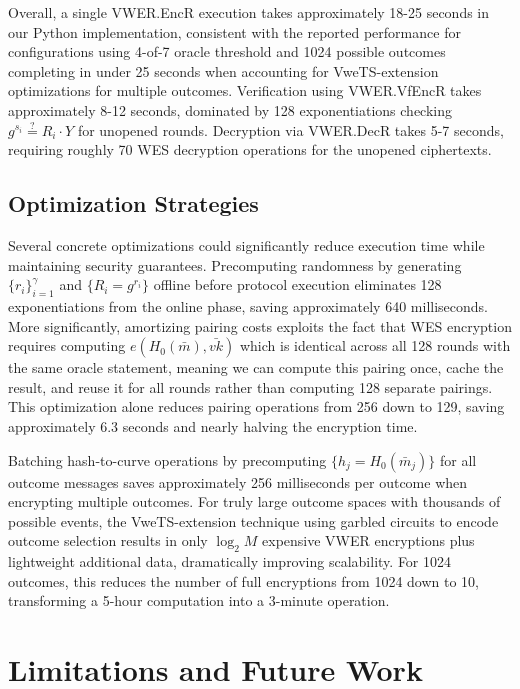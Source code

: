 \documentclass[11pt,a4paper]{article}
\begin{document}
{Overall, a single VWER.EncR execution takes approximately 18-25 seconds in our Python implementation, consistent with the reported performance for configurations using 4-of-7 oracle threshold and 1024 possible outcomes completing in under 25 seconds when accounting for VweTS-extension optimizations for multiple outcomes. Verification using VWER.VfEncR takes approximately 8-12 seconds, dominated by 128 exponentiations checking $g^{s_i} \stackrel{?}{=} R_i \cdot Y$ for unopened rounds. Decryption via VWER.DecR takes 5-7 seconds, requiring roughly 70 WES decryption operations for the unopened ciphertexts.

\subsection{Optimization Strategies}

Several concrete optimizations could significantly reduce execution time while maintaining security guarantees. Precomputing randomness by generating $\{r_i\}_{i=1}^\gamma$ and $\{R_i = g^{r_i}\}$ offline before protocol execution eliminates 128 exponentiations from the online phase, saving approximately 640 milliseconds. More significantly, amortizing pairing costs exploits the fact that WES encryption requires computing $e(H_0(\bar{m}), \bar{vk})$ which is identical across all 128 rounds with the same oracle statement, meaning we can compute this pairing once, cache the result, and reuse it for all rounds rather than computing 128 separate pairings. This optimization alone reduces pairing operations from 256 down to 129, saving approximately 6.3 seconds and nearly halving the encryption time.

Batching hash-to-curve operations by precomputing $\{h_j = H_0(\bar{m}_j)\}$ for all outcome messages saves approximately 256 milliseconds per outcome when encrypting multiple outcomes. For truly large outcome spaces with thousands of possible events, the VweTS-extension technique using garbled circuits to encode outcome selection results in only $\log_2 M$ expensive VWER encryptions plus lightweight additional data, dramatically improving scalability. For 1024 outcomes, this reduces the number of full encryptions from 1024 down to 10, transforming a 5-hour computation into a 3-minute operation.

\section{Limitations and Future Work}

}
\end{document}
